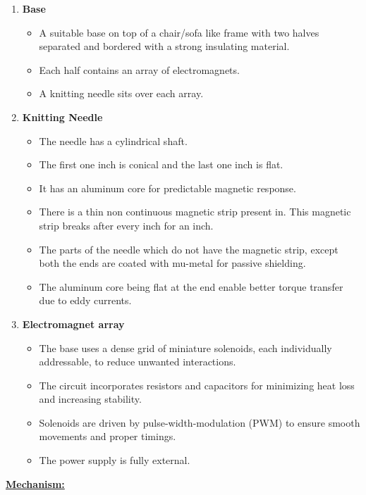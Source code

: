 \documentclass[10pt]{article}
\newcommand{\sectionlabel}[1]{\par\textbf{\underline{#1}}\par}
\begin{document}
\begin{enumerate}
  \item \textbf{Base}
    \begin{itemize}
      \item A suitable base on top of a chair/sofa like frame with two halves separated and bordered with a strong insulating material.
      \item Each half contains an array of electromagnets.
      \item A knitting needle sits over each array.
    \end{itemize}
  \item \textbf{Knitting Needle}
    \begin{itemize}
      \item The needle has a cylindrical shaft.
      \item The first one inch is conical and the last one inch is flat.
      \item It has an aluminum core for predictable magnetic response.
      \item There is a thin non continuous magnetic strip present in. This magnetic strip breaks after every inch for an inch.
      \item The parts of the needle which do not have the magnetic strip, except both the ends are coated with mu-metal for passive shielding.
      \item The aluminum core being flat at the end enable better torque transfer due to eddy currents.
    \end{itemize}
  \item \textbf{Electromagnet array}
    \begin{itemize}
      \item The base uses a dense grid of miniature solenoids, each individually addressable, to reduce unwanted interactions.
      \item The circuit incorporates resistors and capacitors for minimizing heat loss and increasing stability.
      \item Solenoids are driven by pulse-width-modulation (PWM) to ensure smooth movements and proper timings.
      \item The power supply is fully external.
    \end{itemize}
\end{enumerate}

\sectionlabel{Mechanism:}
\end{document}
